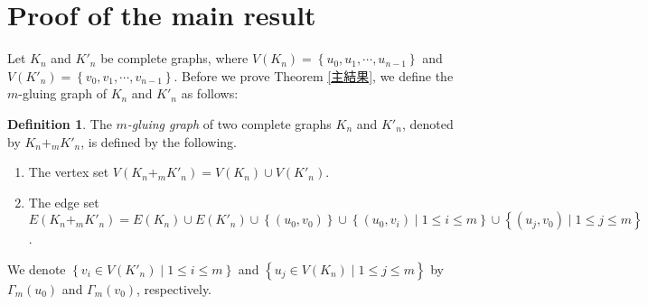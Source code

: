 \documentclass[leqno,12pt]{amsart} %
\theoremstyle{plain} %
\theoremstyle{definition} %
\newtheorem{definition}[theorem]{\indent\sc Definition}
\begin{document}
\section{Proof of the main result}
Let $K_n$ and $K'_n$ be complete graphs, where $V(K_n) = \left\{ u_0, u_1, \cdots, u_{n-1} \right\}$ and $V(K'_n) = \left\{ v_0, v_1, \cdots, v_{n-1} \right\}$. Before we prove Theorem \ref{主結果}, we define the $m$-gluing graph of $K_n$ and $K'_n$ as follows: 
\begin{definition}
\label{gluing}
The {\em $m$-gluing graph} of two complete graphs $K_n$ and $K'_n$, denoted by $K_{n} +_m K'_{n}$, is defined by the following.
\begin{enumerate}
\item The vertex set $V(K_{n} +_m K'_{n}) = V(K_n) \cup V(K'_n)$.
\item The edge set $E(K_n +_m K'_n) = E(K_n) \cup E(K'_n) \cup \left\{ (u_0, v_0) \right\} \cup \left\{ (u_0, v_i) \mid 1 \leq i \leq m \right\} \cup \left\{ (u_j , v_0) \mid 1 \leq j \leq m \right\}$.
\end{enumerate}
We denote $\left\{ v_i \in V(K'_n) \mid 1 \leq i \leq m \right\}$ and $\left\{ u_j \in V(K_n) \mid 1 \leq j \leq m \right\}$ by $\Gamma_m (u_0)$ and $\Gamma_m (v_0)$, respectively.
\end{definition}
\end{document}
